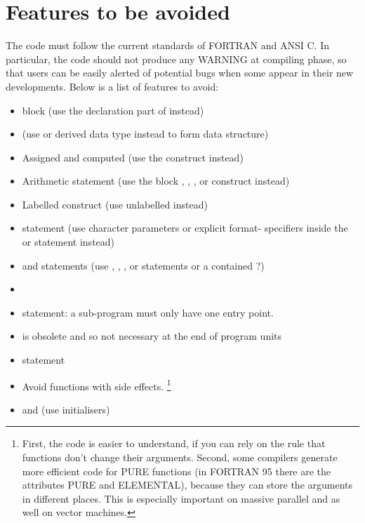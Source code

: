 {\section{Features to be avoided}

The code must follow the current standards of FORTRAN and ANSI C.
In particular, the code should not produce any WARNING at compiling phase, so that
users can be easily alerted of potential bugs when some appear in their new developments.
Below is a list of features to avoid:
\begin{itemize}
\item {} block
  (use the declaration part of  instead)
\item {}
  (use  or derived data type instead to form data structure)
\item Assigned and computed 
  (use the  construct instead)
\item Arithmetic  statement
  (use the block , , ,  or
   construct instead)
\item Labelled  construct
  (use unlabelled  instead)
\item {} statement
  (use character parameters or
  explicit format- specifiers inside the  or  statement instead)
\item {} and  statements
  (use , , ,  or  statements or
  a contained ?)
\item {}
\item {} statement: a sub-program must only have one entry point.
\item {} is obsolete and so not necessary at the end of program units
\item {} statement
\item Avoid functions with side effects.
  \footnote{
    First, the code is easier to understand, if you can rely on
    the rule that functions don't change their arguments.
    Second, some compilers generate more efficient code for PURE functions
    (in FORTRAN 95 there are the attributes PURE and ELEMENTAL), because
    they can store the arguments in different places.
    This is especially important on massive parallel and as well on vector machines.
  }
\item {} and 
  (use initialisers)
\end{itemize}

}
